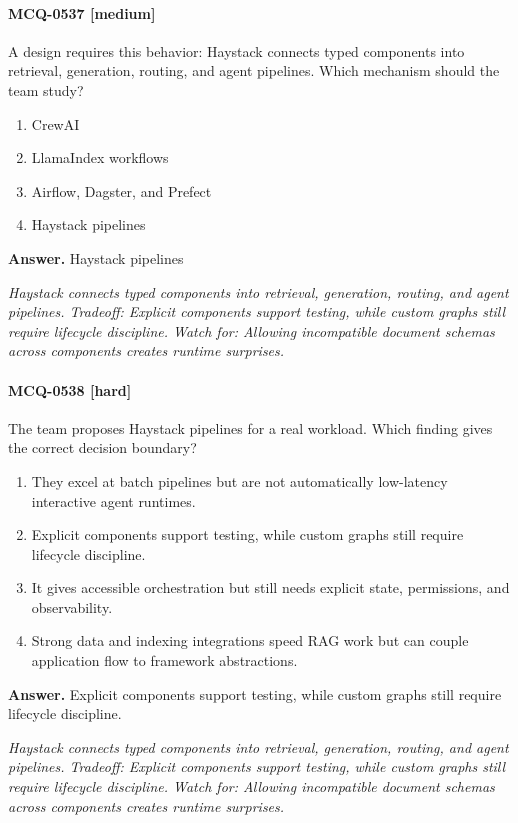 \paragraph{MCQ-0537 [medium]} A design requires this behavior: Haystack connects typed components into retrieval, generation, routing, and agent pipelines. Which mechanism should the team study?
\begin{enumerate}[label=\Alph*.]
\item CrewAI
\item LlamaIndex workflows
\item Airflow, Dagster, and Prefect
\item Haystack pipelines
\end{enumerate}
\noindent\textbf{Answer.} Haystack pipelines
\par\textit{Haystack connects typed components into retrieval, generation, routing, and agent pipelines. Tradeoff: Explicit components support testing, while custom graphs still require lifecycle discipline. Watch for: Allowing incompatible document schemas across components creates runtime surprises.}
\paragraph{MCQ-0538 [hard]} The team proposes Haystack pipelines for a real workload. Which finding gives the correct decision boundary?
\begin{enumerate}[label=\Alph*.]
\item They excel at batch pipelines but are not automatically low-latency interactive agent runtimes.
\item Explicit components support testing, while custom graphs still require lifecycle discipline.
\item It gives accessible orchestration but still needs explicit state, permissions, and observability.
\item Strong data and indexing integrations speed RAG work but can couple application flow to framework abstractions.
\end{enumerate}
\noindent\textbf{Answer.} Explicit components support testing, while custom graphs still require lifecycle discipline.
\par\textit{Haystack connects typed components into retrieval, generation, routing, and agent pipelines. Tradeoff: Explicit components support testing, while custom graphs still require lifecycle discipline. Watch for: Allowing incompatible document schemas across components creates runtime surprises.}
